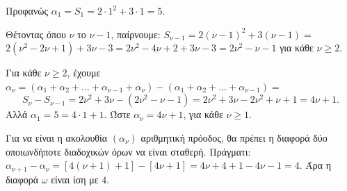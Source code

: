 
\begin{alist}
\item Προφανώς $\alpha_1 = S_1 = 2 \cdot 1^2 + 3 \cdot 1 = 5$.

\item Θέτοντας όπου $\nu$ το $\nu - 1$, παίρνουμε: $S_{\nu-1} = 2(\nu - 1)^2 + 3(\nu - 1) =$
$2(\nu^2 - 2\nu + 1) + 3\nu - 3 = 2\nu^2 - 4\nu + 2 + 3\nu - 3 = 2\nu^2 - \nu - 1$ για κάθε $\nu \ge 2$.

\item Για κάθε $\nu \ge 2$, έχουμε $\alpha_\nu = (\alpha_1 + \alpha_2 + \dots + \alpha_{\nu-1} + \alpha_\nu) - (\alpha_1 + \alpha_2 + \dots + \alpha_{\nu-1}) =$
\[S_\nu - S_{\nu-1} = 2\nu^2 + 3\nu - (2\nu^2 - \nu - 1) = 2\nu^2 + 3\nu - 2\nu^2 + \nu + 1 = 4\nu + 1.\]
Αλλά $\alpha_1 = 5 = 4 \cdot 1 + 1$. Ώστε $\alpha_\nu = 4\nu + 1$, για κάθε $\nu \ge 1$.

\item Για να είναι η ακολουθία $(\alpha_\nu)$ αριθμητική πρόοδος, θα πρέπει η διαφορά
δύο οποιωνδήποτε διαδοχικών όρων να είναι σταθερή.
Πράγματι: $\alpha_{\nu+1} - \alpha_\nu = [4(\nu + 1) + 1] - [4\nu + 1] = 4\nu + 4 + 1 - 4\nu - 1 = 4$.
Άρα η διαφορά $\omega$ είναι ίση με $4$.
\end{alist}

